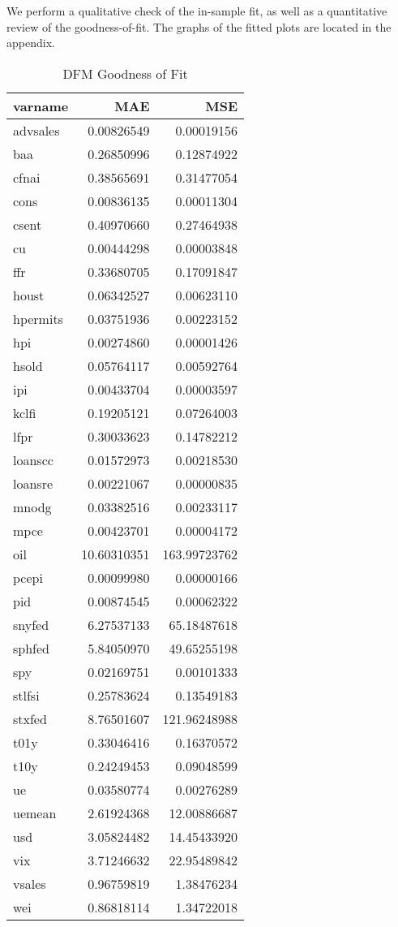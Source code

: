 \documentclass[11pt, letterpaper]{article}\usepackage[]{graphicx}\usepackage[]{color}
\begin{document}
We perform a qualitative check of the in-sample fit, as well as a quantitative review of the goodness-of-fit. The graphs of the fitted plots are located in the appendix.
\begin{table}[H]
\centering
\begingroup\footnotesize
\begin{tabular}{lrr}
  \hline
varname & MAE & MSE \\ 
  \hline
advsales & 0.00826549 & 0.00019156 \\ 
  baa & 0.26850996 & 0.12874922 \\ 
  cfnai & 0.38565691 & 0.31477054 \\ 
  cons & 0.00836135 & 0.00011304 \\ 
  csent & 0.40970660 & 0.27464938 \\ 
  cu & 0.00444298 & 0.00003848 \\ 
  ffr & 0.33680705 & 0.17091847 \\ 
  houst & 0.06342527 & 0.00623110 \\ 
  hpermits & 0.03751936 & 0.00223152 \\ 
  hpi & 0.00274860 & 0.00001426 \\ 
  hsold & 0.05764117 & 0.00592764 \\ 
  ipi & 0.00433704 & 0.00003597 \\ 
  kclfi & 0.19205121 & 0.07264003 \\ 
  lfpr & 0.30033623 & 0.14782212 \\ 
  loanscc & 0.01572973 & 0.00218530 \\ 
  loansre & 0.00221067 & 0.00000835 \\ 
  mnodg & 0.03382516 & 0.00233117 \\ 
  mpce & 0.00423701 & 0.00004172 \\ 
  oil & 10.60310351 & 163.99723762 \\ 
  pcepi & 0.00099980 & 0.00000166 \\ 
  pid & 0.00874545 & 0.00062322 \\ 
  snyfed & 6.27537133 & 65.18487618 \\ 
  sphfed & 5.84050970 & 49.65255198 \\ 
  spy & 0.02169751 & 0.00101333 \\ 
  stlfsi & 0.25783624 & 0.13549183 \\ 
  stxfed & 8.76501607 & 121.96248988 \\ 
  t01y & 0.33046416 & 0.16370572 \\ 
  t10y & 0.24249453 & 0.09048599 \\ 
  ue & 0.03580774 & 0.00276289 \\ 
  uemean & 2.61924368 & 12.00886687 \\ 
  usd & 3.05824482 & 14.45433920 \\ 
  vix & 3.71246632 & 22.95489842 \\ 
  vsales & 0.96759819 & 1.38476234 \\ 
  wei & 0.86818114 & 1.34722018 \\ 
   \hline
\end{tabular}
\endgroup
\caption{DFM Goodness of Fit} 
\end{table}
\end{document}
